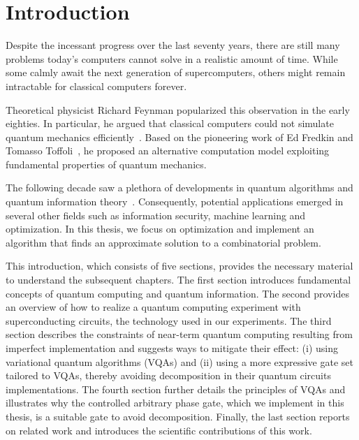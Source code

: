 \glsresetall{}
\chapter{Introduction}
Despite the incessant progress over the last seventy years, there are still many problems today’s computers cannot solve in a realistic amount of time. While some calmly await the next generation of supercomputers, others might remain intractable for classical computers forever.

Theoretical physicist Richard Feynman popularized this observation in the early eighties. In particular, he argued that classical computers could not simulate quantum mechanics efficiently~\cite{Feynman1982SimulatingComputers}. Based on the pioneering work of Ed Fredkin and Tomasso Toffoli~\cite{Fredkin1982ConservativeLogic}, he proposed an alternative computation model exploiting fundamental properties of quantum mechanics. %

The following decade saw a plethora of developments in quantum algorithms and quantum information 
theory~\cite{Deutsch1992RapidComputation,Shor1995Polynomial-TimeComputer,Grover1996ASearch,Simon1997OnComputation, Bernstein1997QuantumTheory,Bennett1997StrengthsComputing}. Consequently, potential applications emerged in several other fields such as information security, machine learning and optimization. In this thesis, we focus on optimization and implement an algorithm that finds an approximate solution to a combinatorial problem.

This introduction, which consists of five sections, provides the necessary material to understand the subsequent chapters. The first section introduces fundamental concepts of quantum computing and quantum information. The second provides an overview of how to realize a quantum computing experiment with superconducting circuits, the technology used in our experiments. The third section describes the constraints of near-term quantum computing resulting from imperfect implementation and suggests ways to mitigate their effect: (i) using variational quantum algorithms (VQAs) and (ii) using a more expressive gate set tailored to VQAs, thereby avoiding decomposition in their quantum circuits implementations. The fourth section further details the principles of VQAs and illustrates why the controlled arbitrary phase gate, which we implement in this thesis, is a suitable gate to avoid decomposition. Finally, the last section reports on related work and introduces the scientific contributions of this work. 

